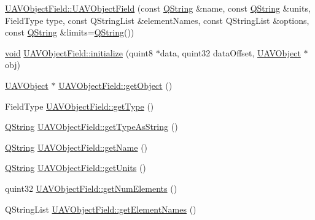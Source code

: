 \begin{DoxyCompactItemize}
\item 
\hyperlink{group___u_a_v_objects_plugin_ga9e178e25087b21a817679f18f3be1fa0}{\-U\-A\-V\-Object\-Field\-::\-U\-A\-V\-Object\-Field} (const \hyperlink{group___u_a_v_objects_plugin_gab9d252f49c333c94a72f97ce3105a32d}{\-Q\-String} \&name, const \hyperlink{group___u_a_v_objects_plugin_gab9d252f49c333c94a72f97ce3105a32d}{\-Q\-String} \&units, \-Field\-Type type, const \-Q\-String\-List \&element\-Names, const \-Q\-String\-List \&options, const \hyperlink{group___u_a_v_objects_plugin_gab9d252f49c333c94a72f97ce3105a32d}{\-Q\-String} \&limits=\hyperlink{group___u_a_v_objects_plugin_gab9d252f49c333c94a72f97ce3105a32d}{\-Q\-String}())
\item 
\hyperlink{group___u_a_v_objects_plugin_ga444cf2ff3f0ecbe028adce838d373f5c}{void} \hyperlink{group___u_a_v_objects_plugin_ga76826ee85ebb06f48a3afb3cc7a1c839}{\-U\-A\-V\-Object\-Field\-::initialize} (quint8 $\ast$data, quint32 data\-Offset, \hyperlink{class_u_a_v_object}{\-U\-A\-V\-Object} $\ast$obj)
\item 
\hyperlink{class_u_a_v_object}{\-U\-A\-V\-Object} $\ast$ \hyperlink{group___u_a_v_objects_plugin_ga9a3e58eb1d96fbb375c9e28f870ae1d3}{\-U\-A\-V\-Object\-Field\-::get\-Object} ()
\item 
\-Field\-Type \hyperlink{group___u_a_v_objects_plugin_gad306893ea1f5623eaa970e35ffa7d901}{\-U\-A\-V\-Object\-Field\-::get\-Type} ()
\item 
\hyperlink{group___u_a_v_objects_plugin_gab9d252f49c333c94a72f97ce3105a32d}{\-Q\-String} \hyperlink{group___u_a_v_objects_plugin_ga53cf1cae78bc619ca91faffedacfc61f}{\-U\-A\-V\-Object\-Field\-::get\-Type\-As\-String} ()
\item 
\hyperlink{group___u_a_v_objects_plugin_gab9d252f49c333c94a72f97ce3105a32d}{\-Q\-String} \hyperlink{group___u_a_v_objects_plugin_ga86c7c87ecda0ed11b8a2f125b0741bab}{\-U\-A\-V\-Object\-Field\-::get\-Name} ()
\item 
\hyperlink{group___u_a_v_objects_plugin_gab9d252f49c333c94a72f97ce3105a32d}{\-Q\-String} \hyperlink{group___u_a_v_objects_plugin_gabb1e371d4c3d91f70a172d7827db2da8}{\-U\-A\-V\-Object\-Field\-::get\-Units} ()
\item 
quint32 \hyperlink{group___u_a_v_objects_plugin_ga6c929356a6e66fd7c56e9d547e67ef7c}{\-U\-A\-V\-Object\-Field\-::get\-Num\-Elements} ()
\item 
\-Q\-String\-List \hyperlink{group___u_a_v_objects_plugin_ga5686a3cb18234741a84666023acf4e8e}{\-U\-A\-V\-Object\-Field\-::get\-Element\-Names} ()
\item 

\end{DoxyCompactItemize}
